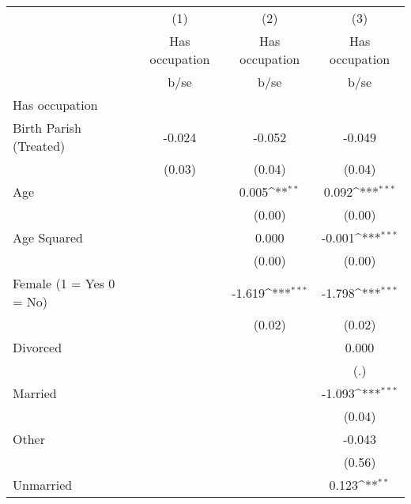 {
\def\sym#1{\ifmmode^{#1}\else\(^{#1}\)\fi}
\begin{tabular}{l*{3}{c}}
\hline\hline
                    &\multicolumn{1}{c}{(1)}&\multicolumn{1}{c}{(2)}&\multicolumn{1}{c}{(3)}\\
                    &\multicolumn{1}{c}{Has occupation}&\multicolumn{1}{c}{Has occupation}&\multicolumn{1}{c}{Has occupation}\\
                    &        b/se         &        b/se         &        b/se         \\
\hline
Has occupation      &                     &                     &                     \\
Birth Parish (Treated)&      -0.024         &      -0.052         &      -0.049         \\
                    &      (0.03)         &      (0.04)         &      (0.04)         \\
Age                 &                     &       0.005\sym{**} &       0.092\sym{***}\\
                    &                     &      (0.00)         &      (0.00)         \\
Age Squared         &                     &       0.000         &      -0.001\sym{***}\\
                    &                     &      (0.00)         &      (0.00)         \\
Female (1 = Yes 0 = No)&                     &      -1.619\sym{***}&      -1.798\sym{***}\\
                    &                     &      (0.02)         &      (0.02)         \\
Divorced            &                     &                     &       0.000         \\
                    &                     &                     &         (.)         \\
Married             &                     &                     &      -1.093\sym{***}\\
                    &                     &                     &      (0.04)         \\
Other               &                     &                     &      -0.043         \\
                    &                     &                     &      (0.56)         \\
Unmarried           &                     &                     &       0.123\sym{**} \\

\end{tabular}}
